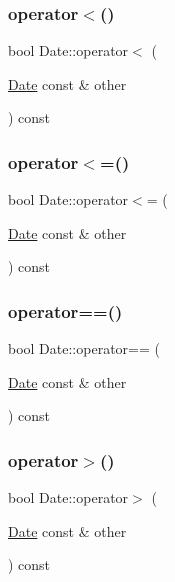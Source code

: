 \subsubsection{\texorpdfstring{operator$<$()}{operator<()}}
{\footnotesize\ttfamily bool Date\+::operator$<$ (\begin{DoxyParamCaption}\item[{\hyperlink{classDate}{Date} const \&}]{other }\end{DoxyParamCaption}) const}

\mbox{\label{classDate_a01c66a5f355ed676a1ee8effb78af222}} 
\subsubsection{\texorpdfstring{operator$<$=()}{operator<=()}}
{\footnotesize\ttfamily bool Date\+::operator$<$= (\begin{DoxyParamCaption}\item[{\hyperlink{classDate}{Date} const \&}]{other }\end{DoxyParamCaption}) const}

\mbox{\label{classDate_a0b4650e6e69f6ab4816ee480b0ae2737}} 
\subsubsection{\texorpdfstring{operator==()}{operator==()}}
{\footnotesize\ttfamily bool Date\+::operator== (\begin{DoxyParamCaption}\item[{\hyperlink{classDate}{Date} const \&}]{other }\end{DoxyParamCaption}) const}

\mbox{\label{classDate_a52d36d1aa6868b5afa178bd495714e44}} 
\subsubsection{\texorpdfstring{operator$>$()}{operator>()}}
{\footnotesize\ttfamily bool Date\+::operator$>$ (\begin{DoxyParamCaption}\item[{\hyperlink{classDate}{Date} const \&}]{other }\end{DoxyParamCaption}) const}

